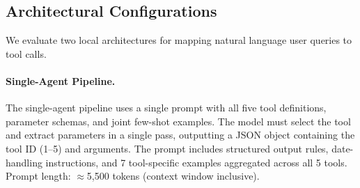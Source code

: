 \documentclass[11pt,twocolumn]{article}
\begin{document}
\begin{table}[t]
\centering
\small
{}
\caption{Tool inventory. The five tools span visualisation (1--3),
aggregation (4), and retrieval (5).}
\label{tab:tools}
\end{table}

\subsection{Architectural Configurations}

We evaluate two local architectures for mapping natural language user
queries to tool calls.

\paragraph{Single-Agent Pipeline.}
The single-agent pipeline uses a single prompt with all five tool
definitions, parameter schemas, and joint few-shot examples.
The model must select the tool and extract parameters in a single
pass, outputting a JSON object containing the tool ID (1--5) and
arguments.
The prompt includes structured output rules, date-handling
instructions, and 7 tool-specific examples aggregated across all 5
tools.
Prompt length: $\approx$5,500 tokens (context window inclusive).
\end{document}
